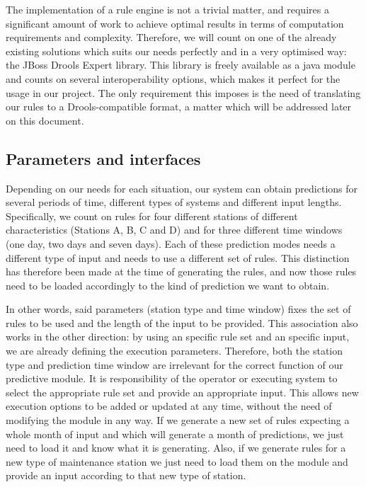 The implementation of a rule engine is not a trivial matter, and requires a significant amount of work to achieve optimal results in terms of computation requirements and complexity. Therefore, we will count on one of the already existing solutions which suits our needs perfectly and in a very optimised way: the JBoss Drools Expert library\cite{browne2009jboss}. This library is freely available as a java module and counts on several interoperability options, which makes it perfect for the usage in our project. The only requirement this imposes is the need of translating our rules to a Drools-compatible format, a matter which will be addressed later on this document.

\subsection{Parameters and interfaces}
\label{sec:parameters_and_interfaces}
Depending on our needs for each situation, our system can obtain predictions for several periods of time, different types of systems and different input lengths. Specifically, we count on rules for four different stations of different characteristics (Stations A, B, C and D) and for three different time windows (one day, two days and seven days). Each of these prediction modes needs a different type of input and needs to use a different set of rules. This distinction has therefore been made at the time of generating the rules, and now those rules need to be loaded accordingly to the kind of prediction we want to obtain.

In other words, said parameters (station type and time window) fixes the set of rules to be used and the length of the input to be provided. This association also works in the other direction: by using an specific rule set and an specific input, we are already defining the execution parameters. Therefore, both the station type and prediction time window are irrelevant for the correct function of our predictive module. It is responsibility of the operator or executing system to select the appropriate rule set and provide an appropriate input. This allows new execution options to be added or updated at any time, without the need of modifying the module in any way. If we generate a new set of rules expecting a whole month of input and which will generate a month of predictions, we just need to load it and know what it is generating. Also, if we generate rules for a new type of maintenance station we just need to load them on the module and provide an input according to that new type of station.

